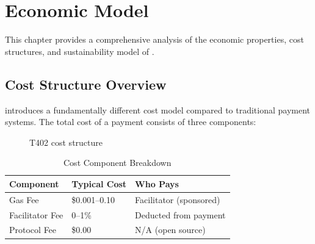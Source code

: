 \chapter{Economic Model}
\label{ch:economics}

This chapter provides a comprehensive analysis of the economic properties, cost structures, and sustainability model of \tprotocol{}.

\section{Cost Structure Overview}
\label{sec:cost-overview}

\tprotocol{} introduces a fundamentally different cost model compared to traditional payment systems. The total cost of a payment consists of three components:

\begin{figure}[htbp]
\centering
{}
\caption{T402 cost structure}
\label{fig:cost-structure}
\end{figure}

\begin{table}[htbp]
\centering
\caption{Cost Component Breakdown}
\label{tab:cost-breakdown}
\begin{tabular}{l l p{5.5cm}}
\toprule
\textbf{Component} & \textbf{Typical Cost} & \textbf{Who Pays} \\
\midrule
Gas Fee & \$0.001--0.10 & Facilitator (sponsored) \\
Facilitator Fee & 0--1\% & Deducted from payment \\
Protocol Fee & \$0.00 & N/A (open source) \\
\bottomrule
\end{tabular}
\end{table}

